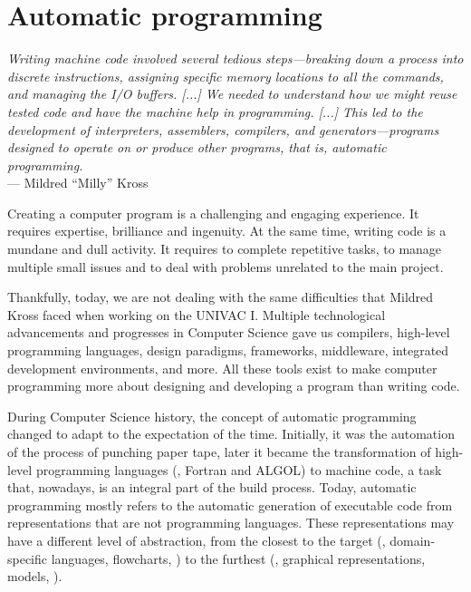 \chapter{Automatic programming}\label{ch:code-gen}

\begin{flushright}{\slshape Writing machine code involved several tedious steps—breaking down a process into discrete instructions, assigning specific memory locations to all the commands, and managing the I/O buffers. [...] We needed to understand how we might reuse tested code and have the machine help in programming. [...] This led to the development of interpreters, assemblers, compilers, and generators—programs designed to operate on or produce other programs, that is, automatic programming.} \\ \medskip
    --- Mildred ``Milly'' Kross
\end{flushright}

Creating a computer program is a challenging and engaging experience. It requires expertise, brilliance and ingenuity. At the same time, writing code is a mundane and dull activity. It requires to complete repetitive tasks, to manage multiple small issues and to deal with problems unrelated to the main project.

Thankfully, today, we are not dealing with the same difficulties that Mildred Kross faced when working on the UNIVAC I. Multiple technological advancements and progresses in Computer Science gave us compilers, high-level programming languages, design paradigms, frameworks, middleware, integrated development environments, and more. All these tools exist to make computer programming more about designing and developing a program than writing code. 

During Computer Science history, the concept of automatic programming changed to adapt to the expectation of the time. Initially, it was the automation of the process of punching paper tape, later it became the transformation of high-level programming languages (\eg, Fortran and ALGOL) to machine code, a task that, nowadays, is an integral part of the build process. Today, automatic programming mostly refers to the automatic generation of executable code from representations that are not programming languages. These representations may have a different level of abstraction, from the closest to the target (\eg, domain-specific languages, flowcharts, \etc) to the furthest (\eg, graphical representations, models, \etc).

